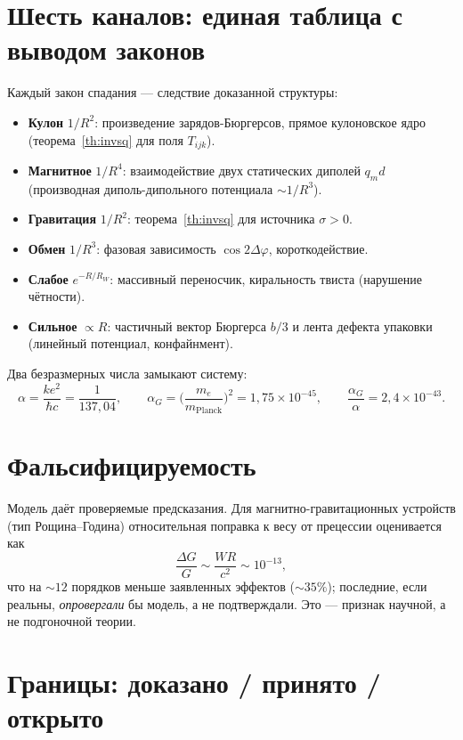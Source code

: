 \documentclass[12pt,a4paper]{article}
\begin{document}
\section{Шесть каналов: единая таблица с выводом законов}
\label{sec:channels}
Каждый закон спадания --- следствие доказанной структуры:
\begin{itemize}[nosep]
\item \textbf{Кулон} $1/R^2$: произведение зарядов-Бюргерсов, прямое кулоновское
ядро (теорема~\ref{th:invsq} для поля $T_{ijk}$).
\item \textbf{Магнитное} $1/R^4$: взаимодействие двух статических диполей
$q_m d$ (производная диполь-дипольного потенциала $\sim1/R^3$).
\item \textbf{Гравитация} $1/R^2$: теорема~\ref{th:invsq} для источника $\sigma>0$.
\item \textbf{Обмен} $1/R^3$: фазовая зависимость $\cos2\Delta\varphi$,
короткодействие.
\item \textbf{Слабое} $e^{-R/R_W}$: массивный переносчик, киральность твиста
(нарушение чётности).
\item \textbf{Сильное} $\propto R$: частичный вектор Бюргерса $b/3$ и лента
дефекта упаковки (линейный потенциал, конфайнмент).
\end{itemize}
Два безразмерных числа замыкают систему:
\begin{equation}
\alpha=\frac{ke^2}{\hbar c}=\frac{1}{137{,}04},\qquad
\alpha_G=\Big(\frac{m_e}{m_{\text{Planck}}}\Big)^2=1{,}75\times10^{-45},\qquad
\frac{\alpha_G}{\alpha}=2{,}4\times10^{-43}.
\end{equation}

\section{Фальсифицируемость}
Модель даёт проверяемые предсказания. Для магнитно-гравитационных устройств
(тип Рощина--Година) относительная поправка к весу от прецессии оценивается как
\begin{equation}
\frac{\Delta G}{G}\sim\frac{W R}{c^2}\sim 10^{-13},
\end{equation}
что на $\sim\!12$ порядков меньше заявленных эффектов ($\sim\!35\%$); последние,
если реальны, \emph{опровергали} бы модель, а не подтверждали. Это --- признак
научной, а не подгоночной теории.

\section{Границы: доказано / принято / открыто}
\end{document}
